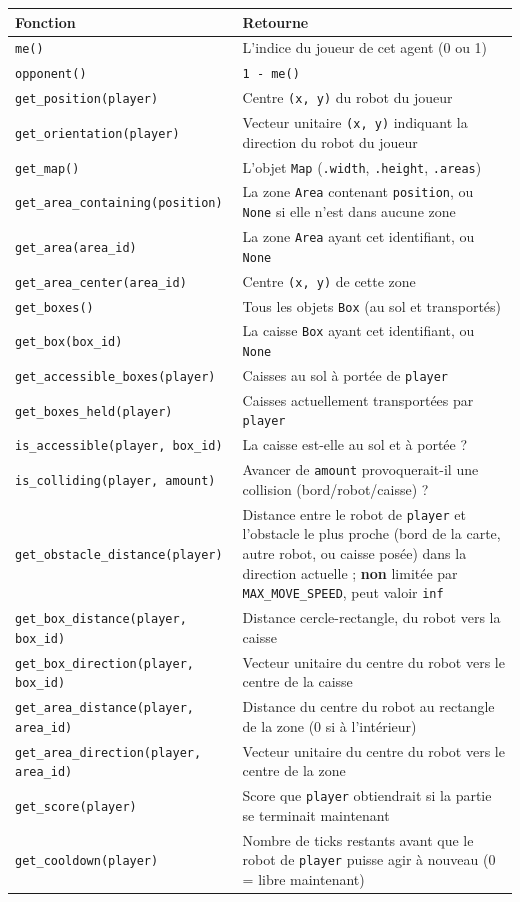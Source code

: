 \documentclass[11pt,a4paper]{article}
\newcommand{\code}[1]{\texttt{#1}}
\newcommand{\func}[1]{\texttt{#1}}
\begin{document}
\begin{longtable}{p{6.7cm}p{8.3cm}}
\toprule
\textbf{Fonction} & \textbf{Retourne} \\
\midrule
\endhead
\func{me()} & L'indice du joueur de cet agent (0 ou 1) \\
\func{opponent()} & \code{1 - me()} \\
\func{get\_position(player)} & Centre \code{(x, y)} du robot du joueur \\
\func{get\_orientation(player)} & Vecteur unitaire \code{(x, y)} indiquant la direction du robot du joueur \\
\func{get\_map()} & L'objet \code{Map} (\code{.width}, \code{.height}, \code{.areas}) \\
\func{get\_area\_containing(position)} & La zone \code{Area} contenant \code{position}, ou \code{None} si elle n'est dans aucune zone \\
\func{get\_area(area\_id)} & La zone \code{Area} ayant cet identifiant, ou \code{None} \\
\func{get\_area\_center(area\_id)} & Centre \code{(x, y)} de cette zone \\
\func{get\_boxes()} & Tous les objets \code{Box} (au sol et transportés) \\
\func{get\_box(box\_id)} & La caisse \code{Box} ayant cet identifiant, ou \code{None} \\
\func{get\_accessible\_boxes(player)} & Caisses au sol à portée de \code{player} \\
\func{get\_boxes\_held(player)} & Caisses actuellement transportées par \code{player} \\
\func{is\_accessible(player, box\_id)} & La caisse est-elle au sol et à portée ? \\
\func{is\_colliding(player, amount)} & Avancer de \code{amount} provoquerait-il une collision (bord/robot/caisse) ? \\
\func{get\_obstacle\_distance(player)} & Distance entre le robot de \code{player} et l'obstacle le plus proche (bord de la carte, autre robot, ou caisse posée) dans la direction actuelle ; \textbf{non} limitée par \code{MAX\_MOVE\_SPEED}, peut valoir \code{inf} \\
\func{get\_box\_distance(player, box\_id)} & Distance cercle-rectangle, du robot vers la caisse \\
\func{get\_box\_direction(player, box\_id)} & Vecteur unitaire du centre du robot vers le centre de la caisse \\
\func{get\_area\_distance(player, area\_id)} & Distance du centre du robot au rectangle de la zone (0 si à l'intérieur) \\
\func{get\_area\_direction(player, area\_id)} & Vecteur unitaire du centre du robot vers le centre de la zone \\
\func{get\_score(player)} & Score que \code{player} obtiendrait si la partie se terminait maintenant \\
\func{get\_cooldown(player)} & Nombre de ticks restants avant que le robot de \code{player} puisse agir à nouveau (0 = libre maintenant) \\
\bottomrule
\end{longtable}
\end{document}
